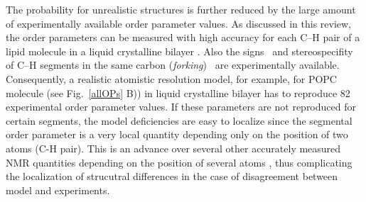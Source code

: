 \documentclass[aps,prl,superscriptaddress,twocolumn]{revtex4}
\begin{document}
The probability for unrealistic structures is further reduced by the large amount of experimentally 
available order parameter values. As discussed in this review, the order parameters can be measured
with high accuracy for each C--H pair of a lipid molecule in a liquid crystalline 
bilayer \cite{seelig77c,jacobs81,davis83,gross97,dvinskikh05a,ferreira13,botan15}.
Also the signs~\cite{hong95a,hong95b,gross97} and stereospecifity of C--H segments 
in the same carbon ({\it forking})~\cite{seelig75,gally81,engel81,gross97,dvinskikh05a,ferreira13}
are experimentally available. Consequently, a realistic atomistic resolution model,
for example, for POPC molecule (see Fig.~\ref{allOPs} B)) in liquid crystalline bilayer has to reproduce 82 experimental order parameter values.
If these parameters are not reproduced for certain segments, the model deficiencies are easy to localize
since the segmental order parameter is a very local quantity depending only on the position of two atoms (C-H pair).
This is an advance over several other accurately measured NMR quantities  
depending on the position of several atoms \cite{prakash10,chowdhary13}, thus complicating the localization of strucutral differences 
in the case of disagreement between model and experiments.
\end{document}
